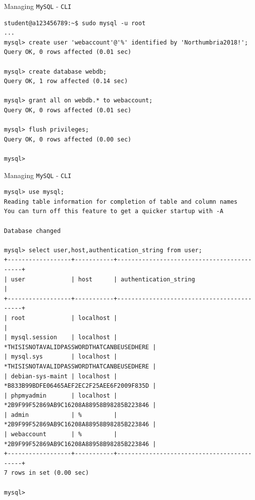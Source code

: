 \documentclass[xcolor=table]{beamer}
\begin{document}
\begin{frame}[fragile]{Managing \texttt{MySQL} - \texttt{CLI}}
  \begin{tcolorbox}
    \lstset{
      basicstyle=\tiny\ttfamily,
    }
    \begin{lstlisting}
student@a123456789:~$ sudo mysql -u root
...
mysql> create user 'webaccount'@'%' identified by 'Northumbria2018!';
Query OK, 0 rows affected (0.01 sec)

mysql> create database webdb;
Query OK, 1 row affected (0.14 sec)

mysql> grant all on webdb.* to webaccount;
Query OK, 0 rows affected (0.01 sec)

mysql> flush privileges;
Query OK, 0 rows affected (0.00 sec)

mysql>
    \end{lstlisting}
  \end{tcolorbox}
\end{frame}

\begin{frame}[fragile]{Managing \texttt{MySQL} - \texttt{CLI}}
  \begin{tcolorbox}
    \lstset{
      basicstyle=\Tiny\ttfamily,
    }
    \begin{lstlisting}
mysql> use mysql;
Reading table information for completion of table and column names
You can turn off this feature to get a quicker startup with -A
    
Database changed
      
mysql> select user,host,authentication_string from user;
+------------------+-----------+-------------------------------------------+
| user             | host      | authentication_string                     |
+------------------+-----------+-------------------------------------------+
| root             | localhost |                                           |
| mysql.session    | localhost | *THISISNOTAVALIDPASSWORDTHATCANBEUSEDHERE |
| mysql.sys        | localhost | *THISISNOTAVALIDPASSWORDTHATCANBEUSEDHERE |
| debian-sys-maint | localhost | *B833B99BDFE06465AEF2EC2F25AEE6F2009F835D |
| phpmyadmin       | localhost | *2B9F99F52869AB9C16208A88958B98285B223846 |
| admin            | %         | *2B9F99F52869AB9C16208A88958B98285B223846 |
| webaccount       | %         | *2B9F99F52869AB9C16208A88958B98285B223846 |
+------------------+-----------+-------------------------------------------+
7 rows in set (0.00 sec)
     
mysql>     
    \end{lstlisting}
  \end{tcolorbox}
\end{frame}
\end{document}
